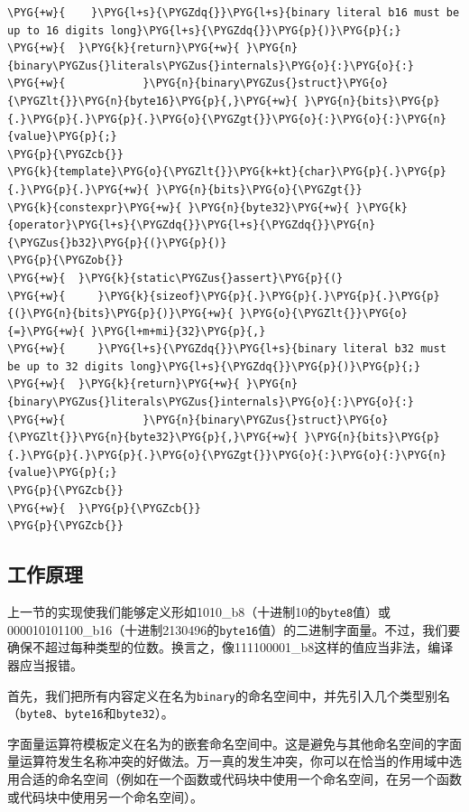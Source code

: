 \begin{codeblockbg}
\begin{Verbatim}[commandchars=\\\{\},breaklines=true,breakanywhere=true,fontsize=\codefont,xleftmargin=17bp]
\PYG{+w}{    }\PYG{l+s}{\PYGZdq{}}\PYG{l+s}{binary literal b16 must be up to 16 digits long}\PYG{l+s}{\PYGZdq{}}\PYG{p}{)}\PYG{p}{;}
\PYG{+w}{  }\PYG{k}{return}\PYG{+w}{ }\PYG{n}{binary\PYGZus{}literals\PYGZus{}internals}\PYG{o}{:}\PYG{o}{:}
\PYG{+w}{            }\PYG{n}{binary\PYGZus{}struct}\PYG{o}{\PYGZlt{}}\PYG{n}{byte16}\PYG{p}{,}\PYG{+w}{ }\PYG{n}{bits}\PYG{p}{.}\PYG{p}{.}\PYG{p}{.}\PYG{o}{\PYGZgt{}}\PYG{o}{:}\PYG{o}{:}\PYG{n}{value}\PYG{p}{;}
\PYG{p}{\PYGZcb{}}
\PYG{k}{template}\PYG{o}{\PYGZlt{}}\PYG{k+kt}{char}\PYG{p}{.}\PYG{p}{.}\PYG{p}{.}\PYG{+w}{ }\PYG{n}{bits}\PYG{o}{\PYGZgt{}}
\PYG{k}{constexpr}\PYG{+w}{ }\PYG{n}{byte32}\PYG{+w}{ }\PYG{k}{operator}\PYG{l+s}{\PYGZdq{}}\PYG{l+s}{\PYGZdq{}}\PYG{n}{\PYGZus{}b32}\PYG{p}{(}\PYG{p}{)}
\PYG{p}{\PYGZob{}}
\PYG{+w}{  }\PYG{k}{static\PYGZus{}assert}\PYG{p}{(}
\PYG{+w}{     }\PYG{k}{sizeof}\PYG{p}{.}\PYG{p}{.}\PYG{p}{.}\PYG{p}{(}\PYG{n}{bits}\PYG{p}{)}\PYG{+w}{ }\PYG{o}{\PYGZlt{}}\PYG{o}{=}\PYG{+w}{ }\PYG{l+m+mi}{32}\PYG{p}{,}
\PYG{+w}{     }\PYG{l+s}{\PYGZdq{}}\PYG{l+s}{binary literal b32 must be up to 32 digits long}\PYG{l+s}{\PYGZdq{}}\PYG{p}{)}\PYG{p}{;}
\PYG{+w}{  }\PYG{k}{return}\PYG{+w}{ }\PYG{n}{binary\PYGZus{}literals\PYGZus{}internals}\PYG{o}{:}\PYG{o}{:}
\PYG{+w}{            }\PYG{n}{binary\PYGZus{}struct}\PYG{o}{\PYGZlt{}}\PYG{n}{byte32}\PYG{p}{,}\PYG{+w}{ }\PYG{n}{bits}\PYG{p}{.}\PYG{p}{.}\PYG{p}{.}\PYG{o}{\PYGZgt{}}\PYG{o}{:}\PYG{o}{:}\PYG{n}{value}\PYG{p}{;}
\PYG{p}{\PYGZcb{}}
\PYG{+w}{  }\PYG{p}{\PYGZcb{}}
\PYG{p}{\PYGZcb{}}
\end{Verbatim}
\end{codeblockbg}



\subsection{工作原理}



上一节的实现使我们能够定义形如1010\_b8（十进制10的\texttt{byte8}值）或000010101100\_b16（十进制2130496的\texttt{byte16}值）的二进制字面量。不过，我们要确保不超过每种类型的位数。换言之，像111100001\_b8这样的值应当非法，编译器应当报错。



首先，我们把所有内容定义在名为\texttt{binary}的命名空间中，并先引入几个类型别名（\texttt{byte8}、\texttt{byte16}和\texttt{byte32}）。



字面量运算符模板定义在名为的嵌套命名空间中。这是避免与其他命名空间的字面量运算符发生名称冲突的好做法。万一真的发生冲突，你可以在恰当的作用域中选用合适的命名空间（例如在一个函数或代码块中使用一个命名空间，在另一个函数或代码块中使用另一个命名空间）。


